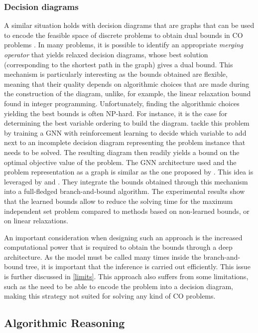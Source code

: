 \documentclass[twoside,11pt]{article}
\newcommand{\new}[1]{\emph{#1}}
\begin{document}
\subsubsection{Decision diagrams}
 
A similar situation holds with decision diagrams that are graphs that can be used to encode the feasible space of discrete problems to obtain dual bounds in CO problems \citep{bergman2016decision}. In many problems, it is possible to identify an appropriate \new{merging operator} that yields relaxed decision diagrams, whose best solution (corresponding to the shortest path in the graph) gives a dual bound. 
This mechanism is particularly interesting as the bounds obtained are flexible, meaning that their quality depends on algorithmic choices that are made during the construction of the diagram, unlike, for example, the linear relaxation bound found in integer programming.
Unfortunately, finding the algorithmic choices yielding the best bounds is often \textsf{NP}-hard. 
For instance, it is the case for determining the best variable ordering to build the diagram.
\citet{cappart2019improving} tackle this problem by training a GNN with reinforcement learning to decide which variable to add next to an incomplete decision diagram representing the problem instance that needs to be solved. 
The resulting diagram then readily yields a bound on the optimal objective value of the problem. The GNN architecture used and the problem representation as a graph is similar as the one proposed by \citet{Khalil2017}.
This idea is leveraged by \citet{parjadis2021improving} and \citet{cappart2022improving}.
They integrate the bounds obtained through this mechanism into a full-fledged branch-and-bound algorithm. The experimental results show that the learned bounds allow to reduce the solving time for the maximum independent set problem compared to methods based on non-learned bounds, 
or on linear relaxations. 

An important consideration  when designing such an approach is the increased computational power that is required  to obtain the bounds through a deep architecture.
As the model must be called many times inside the branch-and-bound tree, 
it is important that the inference is carried out efficiently. 
This issue is further discussed in \cref{limits}. This approach also suffers from some limitations, such as the need to be able to encode the problem into
a decision diagram, making this strategy not suited for solving any kind of CO problems.

\subsection{Algorithmic Reasoning}\label{algo}
\label{sec:algoreasoning}
\end{document}
